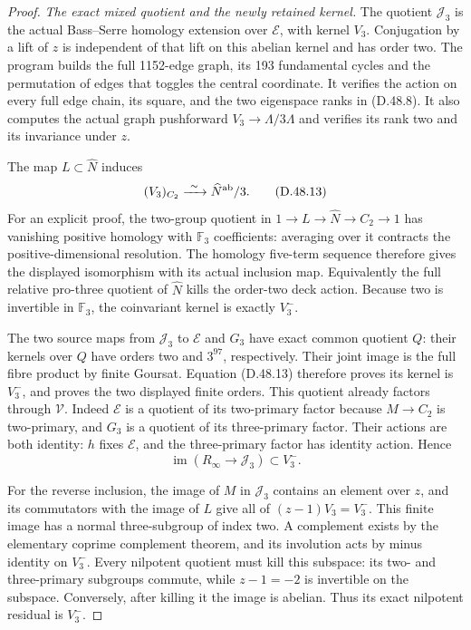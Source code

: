 \begin{proof}
\emph{The exact mixed quotient and the newly retained kernel.}
The quotient \(\mathcal J_3\) is the actual Bass--Serre
homology extension over \(\mathcal E\), with kernel
\(V_3\). Conjugation by a lift of \(z\) is independent
of that lift on this abelian kernel and has order two.
The program builds the full 1152-edge graph, its 193
fundamental cycles and the permutation of edges that
toggles the central coordinate. It verifies the action
on every full edge chain, its square, and the two
eigenspace ranks in (D.48.8). It also computes the
actual graph pushforward \(V_3\to\Lambda/3\Lambda\)
and verifies its rank two and its invariance under \(z\).

The map \(L\subset\widehat N\) induces
\[
              (V_3)_{C_2}\xrightarrow{\ \sim\ }
                         \widehat N^{\rm ab}/3.
                                                               \tag{D.48.13}
\]
For an explicit proof, the two-group quotient in
\(1\to L\to\widehat N\to C_2\to1\) has vanishing
positive homology with \(\mathbb F_3\) coefficients:
averaging over it contracts the positive-dimensional
resolution. The homology five-term sequence therefore
gives the displayed isomorphism with its actual inclusion
map. Equivalently the full relative pro-three quotient
of \(\widehat N\) kills the order-two deck action.
Because two is invertible in \(\mathbb F_3\), the
coinvariant kernel is exactly \(V_3^-\).

The two source maps from \(\mathcal J_3\) to
\(\mathcal E\) and \(G_3\) have exact common quotient
\(Q\): their kernels over \(Q\) have orders two and
\(3^{97}\), respectively. Their joint image is the
full fibre product by finite Goursat. Equation (D.48.13)
therefore proves its kernel is \(V_3^-\), and proves
the two displayed finite orders. This quotient already
factors through \(\mathcal V\). Indeed \(\mathcal E\)
is a quotient of its two-primary factor because
\(M\to C_2\) is two-primary, and \(G_3\) is a quotient
of its three-primary factor. Their actions are both
identity: \(h\) fixes \(\mathcal E\), and the three-primary
factor has identity action. Hence
\[
              \operatorname{im}(R_\infty\to\mathcal J_3)
                              \subset V_3^- .                 \tag{D.48.14}
\]

For the reverse inclusion, the image of \(M\) in
\(\mathcal J_3\) contains an element over \(z\), and
its commutators with the image of \(L\) give all of
\((z-1)V_3=V_3^-\). This finite image has a normal
three-subgroup of index two. A complement exists by
the elementary coprime complement theorem, and its
involution acts by minus identity on \(V_3^-\).
Every nilpotent quotient must kill this subspace:
its two- and three-primary subgroups commute, while
\(z-1=-2\) is invertible on the subspace. Conversely,
after killing it the image is abelian. Thus its exact
nilpotent residual is \(V_3^-\).


\end{proof}
